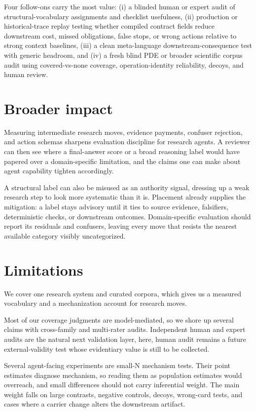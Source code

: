 \documentclass[11pt]{article}
\begin{document}
Four follow-ons carry the most value: (i) a blinded human or expert audit of
structural-vocabulary assignments and checklist usefulness, (ii) production or
historical-trace replay testing whether compiled contract fields reduce
downstream cost, missed obligations, false stops, or wrong actions relative to
strong context baselines, (iii) a clean meta-language downstream-consequence
test with generic headroom, and (iv) a fresh blind PDE or broader scientific
corpus audit using covered-vs-none coverage, operation-identity reliability,
decoys, and human review.

\section{Broader impact}

Measuring intermediate research moves, evidence payments, confuser rejection, and
action schemas sharpens evaluation discipline for research agents. A reviewer can
then see where a final-answer score or a broad reasoning label would have papered
over a domain-specific limitation, and the claims one can make about agent
capability tighten accordingly.

A structural label can also be misused as an authority signal, dressing up a weak
research step to look more systematic than it is. Placement already supplies the
mitigation: a label stays advisory until it ties to source evidence, falsifiers,
deterministic checks, or downstream outcomes. Domain-specific evaluation should
report its residuals and confusers, leaving every move that resists the nearest
available category visibly uncategorized.

\section{Limitations}

We cover one research system and curated corpora, which gives us a measured
vocabulary and a mechanization account for research moves.

Most of our coverage judgments are model-mediated, so we shore up several claims
with cross-family and multi-rater audits. Independent human and expert audits are
the natural next validation layer, here, human audit remains a future
external-validity test whose evidentiary value is still to be collected.

Several agent-facing experiments are small-N mechanism tests. Their point
estimates diagnose mechanism, so reading them as population estimates would
overreach, and small differences should not carry inferential weight. The main
weight falls on large contrasts, negative controls, decoys, wrong-card tests, and
cases where a carrier change alters the downstream artifact.
\end{document}
